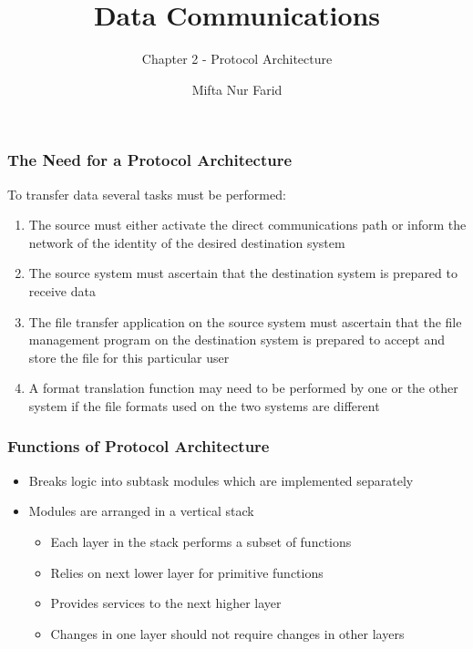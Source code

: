 \documentclass[pdflatex,compress]{beamer}
\title{Data Communications}
\subtitle{Chapter 2 - Protocol Architecture}
\author{Mifta Nur Farid}
\begin{document}
\maketitle

\begin{frame}
	\frametitle{The Need for a Protocol Architecture}
	To transfer data several tasks must be performed:
	\begin{enumerate}
		\item The source must either activate the direct communications path or inform the network of the identity of the desired destination system
		\item The source system must ascertain that the destination system is prepared to receive data
		\item The file transfer application on the source system must ascertain that the file management program on the destination system is prepared to accept and store the file for this particular user
		\item A format translation function may need to be performed by one or the other system if the file formats used on the two systems are different
	\end{enumerate}
\end{frame}

\begin{frame}
	\frametitle{Functions of Protocol Architecture}
	\begin{itemize}
		\item Breaks logic into subtask modules which are implemented separately
		\item Modules are arranged in a vertical stack
		\begin{itemize}
			\item Each layer in the stack performs a subset of functions
			\item Relies on next lower layer for primitive functions
			\item Provides services to the next higher layer
			\item Changes in one layer should not require changes in other layers
		\end{itemize}
	\end{itemize}
\end{frame}
\end{document}
